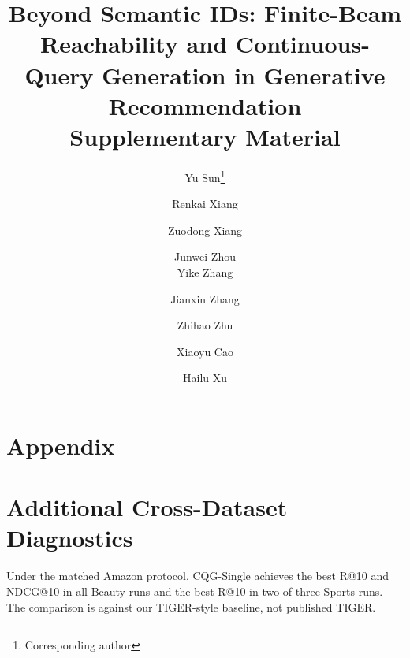 \documentclass[letterpaper]{article}
\title{Beyond Semantic IDs: Finite-Beam Reachability and Continuous-Query Generation in Generative Recommendation\\Supplementary Material}
\author{Yu Sun\thanks{Corresponding author} \and Renkai Xiang \and Zuodong Xiang \and Junwei Zhou \\ Yike Zhang \and Jianxin Zhang \and Zhihao Zhu \and Xiaoyu Cao \and Hailu Xu}
\date{}
\begin{document}
\maketitle

\pagestyle{plain}
\onecolumn
\appendix
\setcounter{secnumdepth}{2}

\section*{Appendix}

\section{Additional Cross-Dataset Diagnostics}
\label{app:auto-completed}
Under the matched Amazon protocol, CQG-Single achieves the best R@10 and
NDCG@10 in all Beauty runs and the best R@10 in two of three Sports runs.
The comparison is against our TIGER-style baseline, not published TIGER.
\end{document}
